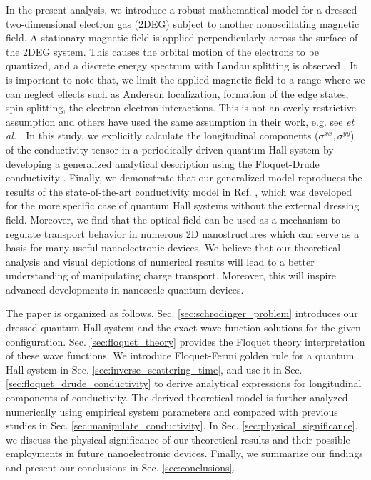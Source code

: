 \documentclass[
 reprint,
 amsmath,amssymb,
 aps,
 prb,
]{revtex4-2}
\begin{document}
In the present analysis, we introduce a robust mathematical model for a dressed two-dimensional electron gas (2DEG) subject to another nonoscillating magnetic field.
A stationary magnetic field is applied perpendicularly across the surface of the 2DEG system. This causes the orbital motion of the electrons to be quantized, and a discrete energy spectrum with Landau splitting is observed \cite{landau30}.
{\color{Red}
It is important to note that, we limit the applied magnetic field to a range where we can neglect effects such as Anderson localization, formation of the edge states, spin splitting, the electron-electron interactions. This is not an overly restrictive assumption and others have used the same assumption in their work, e.g. see \textit{et al.} \cite{endo09}.} In this study, we explicitly calculate the longitudinal components ($\sigma^{xx},\sigma^{yy}$) of the conductivity tensor in a periodically driven quantum Hall system by developing a generalized analytical description using the Floquet-Drude conductivity \cite{wackerl20}.
Finally, we demonstrate that our generalized model reproduces the results of the state-of-the-art conductivity model in Ref. \cite{endo09}, which was developed for the more specific case of quantum Hall systems without the external dressing field.
Moreover, we find that the optical field can be used as a mechanism to regulate transport behavior in numerous 2D nanostructures which can serve as a basis for many useful nanoelectronic devices. We believe that our theoretical analysis and visual depictions of numerical results will lead to a better understanding of manipulating charge transport. Moreover, this will inspire advanced  developments in nanoscale quantum devices.

The paper is organized as follows. Sec.  \ref{sec:schrodinger_problem} introduces our dressed quantum Hall system and the exact wave function solutions for the given configuration. Sec. \ref{sec:floquet_theory} provides the Floquet theory interpretation of these wave functions.
We introduce Floquet-Fermi golden rule for a quantum Hall system in Sec. \ref{sec:inverse_scattering_time}, and use it in Sec. \ref{sec:floquet_drude_conductivity} to derive analytical expressions for longitudinal components of conductivity.
The derived theoretical model is further analyzed numerically using empirical system parameters and compared with previous studies in Sec. \ref{sec:manipulate_conductivity}. {\color{Red}In Sec. \ref{sec:physical_significance}, we discuss the physical significance of our theoretical results and their possible employments in future nanoelectronic devices.
Finally, we summarize our findings and present our conclusions in Sec. \ref{sec:conclusions}.}
\end{document}
